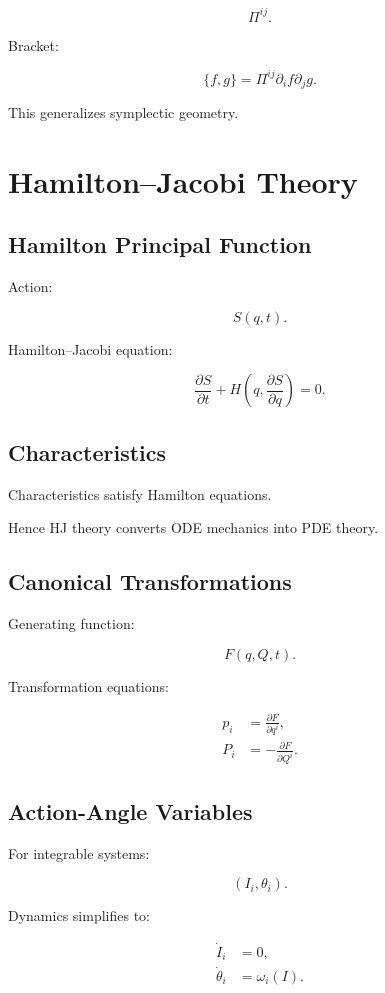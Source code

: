 \documentclass[11pt]{book}
\begin{document}
\[
\Pi^{ij}.
\]

Bracket:

\[
\{f,g\}
=
\Pi^{ij}
\partial_i f
\partial_j g.
\]

This generalizes symplectic geometry.

\chapter{Hamilton--Jacobi Theory}

\section{Hamilton Principal Function}

Action:

\[
S(q,t).
\]

Hamilton--Jacobi equation:

\[
\frac{\partial S}{\partial t}
+
H\left(q,\frac{\partial S}{\partial q}\right)
=0.
\]

\section{Characteristics}

Characteristics satisfy Hamilton equations.

Hence HJ theory converts ODE mechanics into PDE theory.

\section{Canonical Transformations}

Generating function:

\[
F(q,Q,t).
\]

Transformation equations:

\begin{align}
p_i &= \frac{\partial F}{\partial q^i},\\
P_i &= -\frac{\partial F}{\partial Q^i}.
\end{align}

\section{Action-Angle Variables}

For integrable systems:

\[
(I_i,\theta_i).
\]

Dynamics simplifies to:

\begin{align}
\dot I_i &=0,\\
\dot \theta_i &= \omega_i(I).
\end{align}
\end{document}

